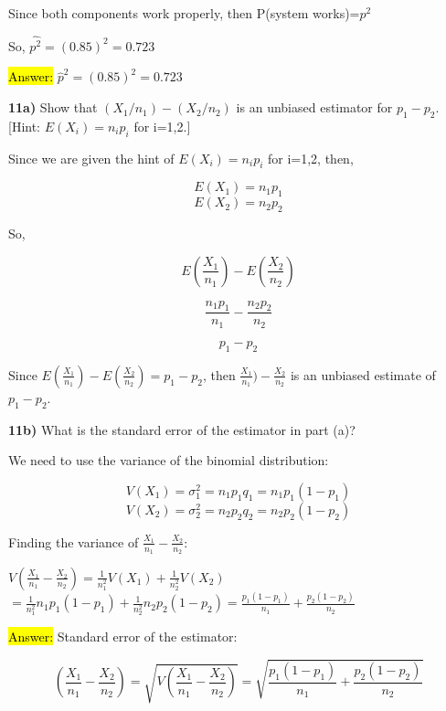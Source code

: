 \documentclass{article}
\begin{document}
\vspace{3mm}

Since both components work properly, then P(system works)=$p^2$

So, $\hat{p^2}=(0.85)^2=0.723$
\vspace{2mm}

\hl{Answer:}  $\hat{p}^{2}=(0.85)^2=0.723$

\newpage

\textbf{11a)}  Show that $(X_{1}/n_{1})-(X_{2}/n_{2})$ is an unbiased estimator for $p_{1} - p_{2}$. [Hint: $E(X_{i} ) = n_{i} p_{i}$ for i=1,2.]
\vspace{3mm}

Since we are given the hint of $E(X_{i} ) = n_{i} p_{i}$ for i=1,2, then,

$$E(X_{1} ) = n_{1} p_{1}$$
$$E(X_{2} ) = n_{2}p_{2}$$

So,

$$E(\frac{X_{1}}{n_{1}})-E(\frac{X_{2}}{n_{2}} )$$


$$\frac{n_{1} p_{1}}{n_{1}}-\frac{n_{2}p_{2}}{n_{2}}$$

$$p_{1} - p_{2}$$


Since $E(\frac{X_{1}}{n_{1}})-E(\frac{X_{2}}{n_{2}} )=p_{1}-p_{2}$, then $\frac{X_{1}}{n_{1}})-\frac{X_{2}}{n_{2}}$ is an unbiased estimate of $p_{1}-p_{2}$.
\vspace{3mm}

\textbf{11b)} What is the standard error of the estimator in part (a)?
\vspace{3mm}

We need to use the variance of the binomial distribution:

$$V(X_{1})=\sigma_{1}^{2}=n_{1}p_{1}q_{1}=n_{1}p_{1}(1-p_{1})$$
$$V(X_{2})=\sigma_{2}^{2}=n_{2}p_{2}q_{2}=n_{2}p_{2}(1-p_{2})$$

Finding the variance of $\frac{X_{1}}{n_{1}}-\frac{X_{2}}{n_{2}}$:
\vspace{3mm}

$V(\frac{X_{1}}{n_{1}}-\frac{X_{2}}{n_{2}})=\frac{1}{n_{1}^{2}}V(X_{1})+\frac{1}{n_{2}^{2}}V(X_{2})$
 $=\frac{1}{n_{1}^{2}}n_{1}p_{1}(1-p_{1})+\frac{1}{n_{2}^{2}}n_{2}p_{2}(1-p_{2})=\frac{p_{1}(1-p_{1})}{n_{1}}+\frac{p_{2}(1-p_{2})}{n_{2}}$
 
 \vspace{3mm}
 
\hl{Answer:}  Standard error of the estimator:

$$(\frac{X_{1}}{n_{1}}-\frac{X_{2}}{n_{2}})=\sqrt{V(\frac{X_{1}}{n_{1}}-\frac{X_{2}}{n_{2}})}=\sqrt{\frac{p_{1}(1-p_{1})}{n_{1}}+\frac{p_{2}(1-p_{2})}{n_{2}}}$$
\end{document}
